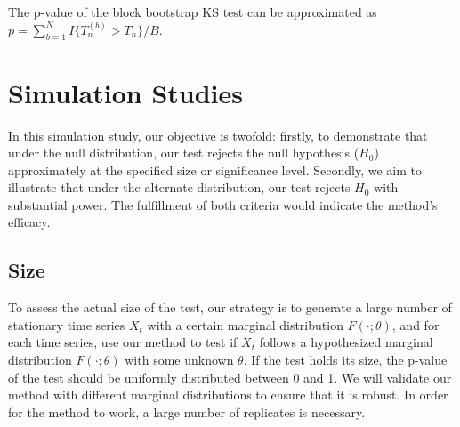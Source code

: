 \documentclass[APA,Times1COL]{WileyNJDv5} %
\begin{document}
The p-value of the block bootstrap KS test can be approximated
as $p = \sum_{b=1}^N I\{T^{(b)}_n > T_n\} / B$.

\section{Simulation Studies}\label{sec:simu}

In this simulation study, our objective is twofold: firstly, to demonstrate that
under the null distribution, our test rejects the null hypothesis ($H_0$) 
approximately at the specified size or significance level. Secondly, we aim to
illustrate that under the alternate distribution, our test rejects
$H_0$ with substantial power. The fulfillment of both criteria would indicate
the method's efficacy.


\subsection{Size}
To assess the actual size of the test, our strategy is to
generate a large number of stationary time series $X_t$ with a certain marginal
distribution $F(\cdot; \theta)$, and for each time series, use our method to
test if $X_t$ follows a hypothesized marginal distribution $F(\cdot; \theta)$
with some unknown $\theta$. If the test holds its size, the p-value
of the test should be uniformly distributed between 0 and 1. We will validate
our method with different marginal distributions to ensure that it is robust.
In order for the method to work, a large number of replicates is necessary. 
\end{document}

